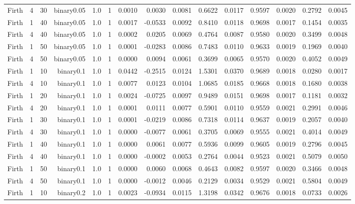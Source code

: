 \begin{longtable}{rrrrrrrrrrrrrrr}
  Firth & 4 & 30 & binary0.05 & 1.0 & 1 & 0.0010 & 0.0030 & 0.0081 & 0.6622 & 0.0117 & 0.9597 & 0.0020 & 0.2792 & 0.0045 \\ 
  Firth & 1 & 40 & binary0.05 & 1.0 & 1 & 0.0017 & -0.0533 & 0.0092 & 0.8410 & 0.0118 & 0.9698 & 0.0017 & 0.1454 & 0.0035 \\ 
  Firth & 4 & 40 & binary0.05 & 1.0 & 1 & 0.0002 & 0.0205 & 0.0069 & 0.4764 & 0.0087 & 0.9580 & 0.0020 & 0.3499 & 0.0048 \\ 
  Firth & 1 & 50 & binary0.05 & 1.0 & 1 & 0.0001 & -0.0283 & 0.0086 & 0.7483 & 0.0110 & 0.9633 & 0.0019 & 0.1969 & 0.0040 \\ 
  Firth & 4 & 50 & binary0.05 & 1.0 & 1 & 0.0000 & 0.0094 & 0.0061 & 0.3699 & 0.0065 & 0.9570 & 0.0020 & 0.4052 & 0.0049 \\ 
  Firth & 1 & 10 & binary0.1 & 1.0 & 1 & 0.0442 & -0.2515 & 0.0124 & 1.5301 & 0.0370 & 0.9689 & 0.0018 & 0.0280 & 0.0017 \\ 
  Firth & 4 & 10 & binary0.1 & 1.0 & 1 & 0.0077 & 0.0123 & 0.0104 & 1.0685 & 0.0185 & 0.9668 & 0.0018 & 0.1680 & 0.0038 \\ 
  Firth & 1 & 20 & binary0.1 & 1.0 & 1 & 0.0024 & -0.0725 & 0.0097 & 0.9489 & 0.0151 & 0.9698 & 0.0017 & 0.1181 & 0.0032 \\ 
  Firth & 4 & 20 & binary0.1 & 1.0 & 1 & 0.0001 & 0.0111 & 0.0077 & 0.5901 & 0.0110 & 0.9559 & 0.0021 & 0.2991 & 0.0046 \\ 
  Firth & 1 & 30 & binary0.1 & 1.0 & 1 & 0.0001 & -0.0219 & 0.0086 & 0.7318 & 0.0114 & 0.9637 & 0.0019 & 0.2057 & 0.0040 \\ 
  Firth & 4 & 30 & binary0.1 & 1.0 & 1 & 0.0000 & -0.0077 & 0.0061 & 0.3705 & 0.0069 & 0.9555 & 0.0021 & 0.4014 & 0.0049 \\ 
  Firth & 1 & 40 & binary0.1 & 1.0 & 1 & 0.0000 & 0.0061 & 0.0077 & 0.5936 & 0.0099 & 0.9605 & 0.0019 & 0.2796 & 0.0045 \\ 
  Firth & 4 & 40 & binary0.1 & 1.0 & 1 & 0.0000 & -0.0002 & 0.0053 & 0.2764 & 0.0044 & 0.9523 & 0.0021 & 0.5079 & 0.0050 \\ 
  Firth & 1 & 50 & binary0.1 & 1.0 & 1 & 0.0000 & 0.0060 & 0.0068 & 0.4643 & 0.0082 & 0.9597 & 0.0020 & 0.3466 & 0.0048 \\ 
  Firth & 4 & 50 & binary0.1 & 1.0 & 1 & 0.0000 & -0.0012 & 0.0046 & 0.2129 & 0.0034 & 0.9529 & 0.0021 & 0.5804 & 0.0049 \\ 
  Firth & 1 & 10 & binary0.2 & 1.0 & 1 & 0.0023 & -0.0934 & 0.0115 & 1.3198 & 0.0342 & 0.9676 & 0.0018 & 0.0733 & 0.0026 \\ 

\end{longtable}
